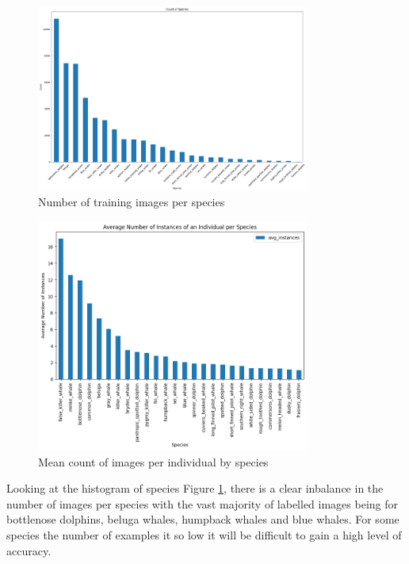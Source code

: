 \documentclass{article}
\begin{document}
\begin{figure}[!htb]
    \centering
    \includegraphics[width=0.8\textwidth]{species_histogram.png}
    \caption{Number of training images per species}
    \label{fig:species_count_histogram}
\end{figure}

\begin{figure}[!htb]
    \centering
    \includegraphics[width=0.8\textwidth]{mean_individuals_histogram.png}
    \caption{Mean count of images per individual by species}
    \label{fig:individual_mean_count_histogram}
\end{figure}

Looking at the histogram of species Figure \ref{fig:species_count_histogram}, there is a clear inbalance in the number of images per species with the vast majority
of labelled images being for bottlenose dolphins, beluga whales, humpback whales and blue whales. For some species the number of examples it so low it will be difficult to gain a high level of accuracy.
\end{document}

